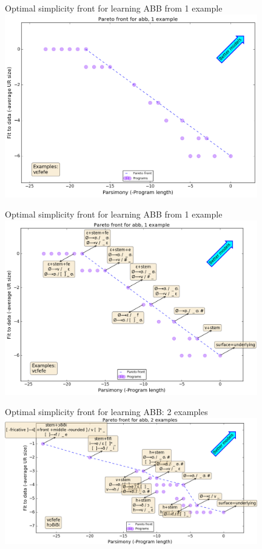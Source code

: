 \documentclass{beamer}
\begin{document}
\begin{frame}{Optimal simplicity front for learning ABB from  1 example}
  \centering  \includegraphics[width = 11cm]{marcusAnimation3.png}    
\end{frame}
\begin{frame}{Optimal simplicity front for learning ABB from  1 example}
  \centering  \includegraphics[width = 11cm]{marcusAnimation4.png}   
\end{frame}

\begin{frame}{Optimal simplicity front for learning ABB: 2 examples}
  \centering  \includegraphics[width = 11cm]{syllableFront2.png}  
\end{frame}
\end{document}
